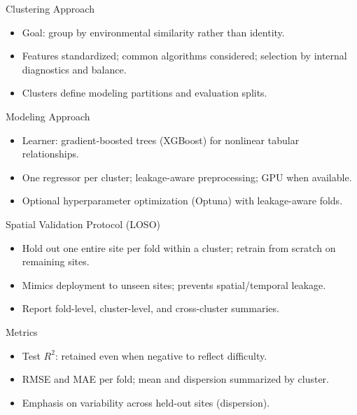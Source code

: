 \documentclass{beamer}
\begin{document}
\begin{frame}{Clustering Approach}
  \begin{itemize}
    \item Goal: group by environmental similarity rather than identity.
    \item Features standardized; common algorithms considered; selection by internal diagnostics and balance.
    \item Clusters define modeling partitions and evaluation splits.
  \end{itemize}
\end{frame}

\begin{frame}{Modeling Approach}
  \begin{itemize}
    \item Learner: gradient-boosted trees (XGBoost) for nonlinear tabular relationships.
    \item One regressor per cluster; leakage-aware preprocessing; GPU when available.
    \item Optional hyperparameter optimization (Optuna) with leakage-aware folds.
  \end{itemize}
\end{frame}

\begin{frame}{Spatial Validation Protocol (LOSO)}
  \begin{itemize}
    \item Hold out one entire site per fold within a cluster; retrain from scratch on remaining sites.
    \item Mimics deployment to unseen sites; prevents spatial/temporal leakage.
    \item Report fold-level, cluster-level, and cross-cluster summaries.
  \end{itemize}
\end{frame}

\begin{frame}{Metrics}
  \begin{itemize}
    \item Test \(R^2\): retained even when negative to reflect difficulty.
    \item RMSE and MAE per fold; mean and dispersion summarized by cluster.
    \item Emphasis on variability across held-out sites (dispersion).
  \end{itemize}
\end{frame}
\end{document}
